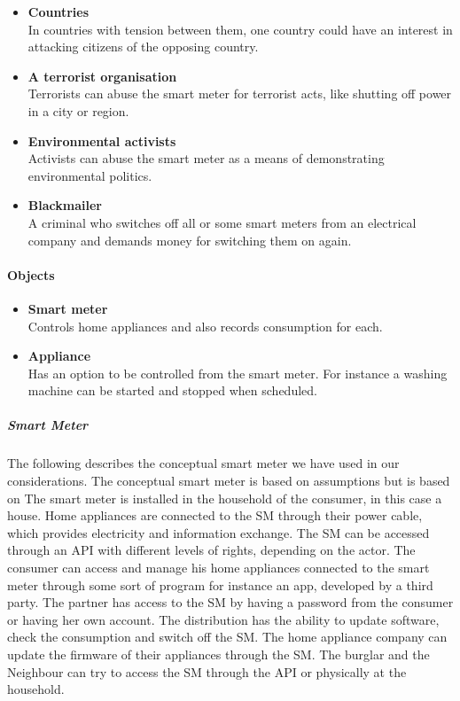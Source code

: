 \begin{itemize}
\item \textbf{Countries}\\ In countries with tension between them, one country could have an interest in attacking citizens of the opposing country.
\item \textbf{A terrorist organisation}\\ Terrorists can abuse the smart meter for terrorist acts, like shutting off power in a city or region.
\item \textbf{Environmental activists}\\ Activists can abuse the smart meter as a means of demonstrating environmental politics.
\item \textbf{Blackmailer}\\ A criminal who switches off all or some smart meters from an electrical company and demands money for switching them on again.
\end{itemize}

\paragraph{Objects}
\begin{itemize}
\item \textbf{Smart meter}\\ Controls home appliances and also records consumption for each.
\item \textbf{Appliance}\\ Has an option to be controlled from the smart meter. For instance a washing machine can be started and stopped when scheduled.
\end{itemize}

\subparagraph{Smart Meter}
The following describes the conceptual smart meter we have used in our considerations.
The conceptual smart meter is based on assumptions but is based on 
The smart meter is installed in the household of the consumer, in this case a house.
Home appliances are connected to the SM through their power cable, which provides electricity and information exchange.
The SM can be accessed through an API with different levels of rights, depending on the actor.
The consumer can access and manage his home appliances connected to the smart meter through some sort of program for instance an app, developed by a third party.
The partner has access to the SM by having a password from the consumer or having her own account.
The distribution has the ability to update software, check the consumption and switch off the SM.
The home appliance company can update the firmware of their appliances through the SM.
The burglar and the Neighbour can try to access the SM through the API or physically at the household.
